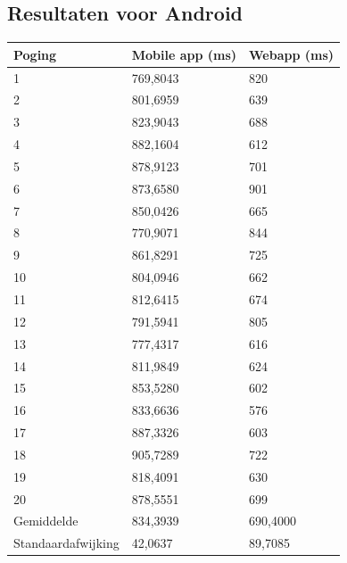 \documentclass[pdftex,a4paper,12pt,twoside]{report}
\begin{document}
\subsection{Resultaten voor Android}
\begin{center}
    \begin{tabular}{ | l | l | l |}
    \hline
    Poging & Mobile app (ms) & Webapp (ms)
      \\ \hline
      1 & 769,8043 & 820
      \\ \hline
      2 & 801,6959 & 639
      \\ \hline
      3 & 823,9043 & 688
      \\ \hline
      4 & 882,1604 & 612
      \\ \hline
      5 & 878,9123 & 701
      \\ \hline
      6 & 873,6580 & 901
      \\ \hline
      7 & 850,0426 & 665
      \\ \hline
      8 & 770,9071 & 844
      \\ \hline
      9 & 861,8291 & 725
      \\ \hline
      10 & 804,0946 & 662
      \\ \hline
      11 & 812,6415 & 674
      \\ \hline
      12 & 791,5941 & 805
      \\ \hline
      13 & 777,4317 & 616
      \\ \hline
      14 & 811,9849 & 624
      \\ \hline
      15 & 853,5280 & 602
      \\ \hline
      16 & 833,6636 & 576
      \\ \hline
      17 & 887,3326 & 603
      \\ \hline
      18 & 905,7289 & 722
      \\ \hline
      19 & 818,4091 & 630
      \\ \hline
      20 & 878,5551 & 699
      \\ \hline
      Gemiddelde & 834,3939 & 690,4000
      \\ \hline
      Standaardafwijking & 42,0637 & 89,7085
      \\ \hline
    \end{tabular}
\end{center}
\newpage
\end{document}
